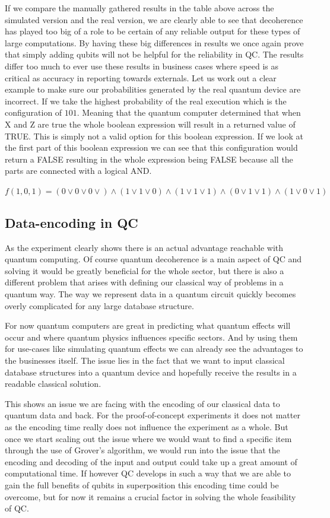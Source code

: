 If we compare the manually gathered results in the table above across the simulated version and the real version, we are clearly able to see that decoherence has played too big of a role to be certain of any reliable output for these types of large computations. By having these big differences in results we once again prove that simply adding qubits will not be helpful for the reliability in QC. The results differ too much to ever use these results in business cases where speed is as critical as accuracy in reporting towards externals.
Let us work out a clear example to make sure our probabilities generated by the real quantum device are incorrect. If we take the highest probability of the real execution which is the configuration of $101$. Meaning that the quantum computer determined that when X and Z are true the whole boolean expression will result in a returned value of TRUE. This is simply not a valid option for this boolean expression. If we look at the first part of this boolean expression we can see that this configuration would return a FALSE resulting in the whole expression being FALSE because all the parts are connected with a logical AND. 

$f(1,0,1) = (0 \vee 0 \vee 0 \vee) \wedge (1 \vee 1 \vee 0)  \wedge ( 1 \vee 1 \vee  1) \wedge ( 0 \vee 1 \vee 1) \wedge  ( 1 \vee 0 \vee  1)$


\subsection{Data-encoding in QC}

As the experiment clearly shows there is an actual advantage reachable with quantum computing. Of course quantum decoherence is a main aspect of QC and solving it would be greatly beneficial for the whole sector, but there is also a different problem that arises with defining our classical way of problems in a quantum way. The way we represent data in a quantum circuit quickly becomes overly complicated for any large database structure.

For now quantum computers are great in predicting what quantum effects will occur and where quantum physics influences specific sectors. And by using them for use-cases like simulating quantum effects we can already see the advantages to the businesses itself. The issue lies in the fact that we want to input  classical database structures into a quantum device and hopefully receive the results in a readable classical solution. 

This shows an issue we are facing with the encoding of our classical data to quantum data and back. For the proof-of-concept experiments it does not matter as the encoding time really does not influence the experiment as a whole. But once we start scaling out the issue where we would want to find a specific item through the use of Grover's algorithm, we would run into the issue that the encoding and decoding of the input and output could take up a great amount of computational time. If however QC develops in such a way that we are able to gain the full benefits of qubits in superposition this encoding time could be overcome, but for now it remains a crucial factor in solving the whole feasibility of QC.



